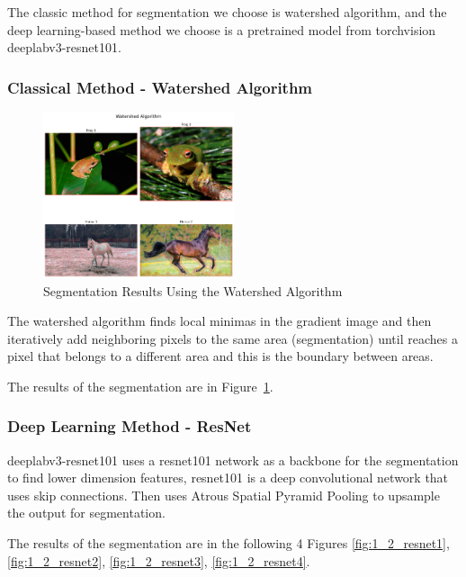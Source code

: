 \documentclass{article}
\begin{document}
The classic method for segmentation we choose is watershed algorithm, and the deep learning-based method we choose is a pretrained model from torchvision deeplabv3-resnet101.

\subsubsection*{Classical Method - Watershed Algorithm}

\begin{figure}[h!]
    \centering
    \includegraphics[width=0.5\textwidth]{../output/1.2_watershed.png}
    \caption{Segmentation Results Using the Watershed Algorithm}
    \label{fig:1_2_watershed}
\end{figure}

The watershed algorithm finds local minimas in the gradient image and then iteratively add neighboring pixels to the same area (segmentation) until reaches a pixel that belongs to a different area and this is the boundary between areas. 

The results of the segmentation are in Figure~\ref{fig:1_2_watershed}.

\subsubsection*{Deep Learning Method - ResNet}

deeplabv3-resnet101 uses a resnet101 network as a backbone for the segmentation to find lower dimension features, resnet101 is a deep convolutional network that uses skip connections. Then uses Atrous Spatial Pyramid Pooling to upsample the output for segmentation. 

The results of the segmentation are in the following 4 Figures \ref{fig:1_2_resnet1}, \ref{fig:1_2_resnet2}, \ref{fig:1_2_resnet3}, \ref{fig:1_2_resnet4}.
\end{document}
